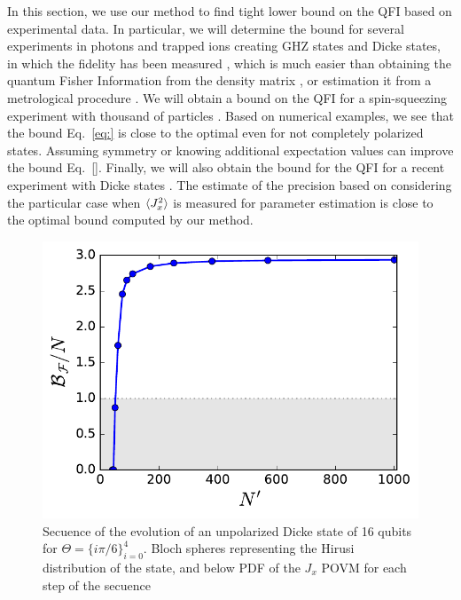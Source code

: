 In this section, we use our method to find tight lower bound on the QFI based on experimental data.
In particular, we will determine the bound for several experiments in photons and trapped ions creating GHZ states and Dicke states, in which the fidelity has been measured \citep{Krischek2011, Zhao2003, Gao2010, Leibfrid2004, Sackett2000, Monz2011, Kiesel2007, Wieczorek2009, Prevedel2009, Chiuri2012}, which is much easier than obtaining the quantum Fisher Information from the density matrix \citep{Hyllus2012}, or estimation it from a metrological procedure \citep{Luecke2011}.
We will obtain a bound on the QFI for a spin-squeezing experiment with thousand of particles \citep{Gross2010}.
Based on numerical examples, we see that the bound Eq.~\eqref{eq:} is close to the optimal even for not completely polarized states.
Assuming symmetry or knowing additional expectation values can improve the bound Eq.~\eqref{}.
Finally, we will also obtain the bound for the QFI for a recent experiment with Dicke states \citep{Lucke2014}.
The estimate of the precision based on considering the particular case when $\langle J_x^2 \rangle$ is measured for parameter estimation \citep{Apellaniz2015} is close to the optimal bound computed by our method. 

\begin{figure}
  \centering
  \caption{}
  \label{fig:lt-spsq-scaling}
\end{figure}

\begin{figure}
  \centering
  \includegraphics[scale=.65]{img/plots/LT_dicke_7900_asymp.pdf}
  \caption{Secuence of the evolution of an unpolarized Dicke state of 16 qubits for $\Theta=\{i\pi/6\}_{i=0}^4$. Bloch spheres representing the Hirusi distribution of the state, and below PDF of the $J_x$ POVM for each step of the secuence}
  \label{fig:vd-secuence-evo}
\end{figure}

